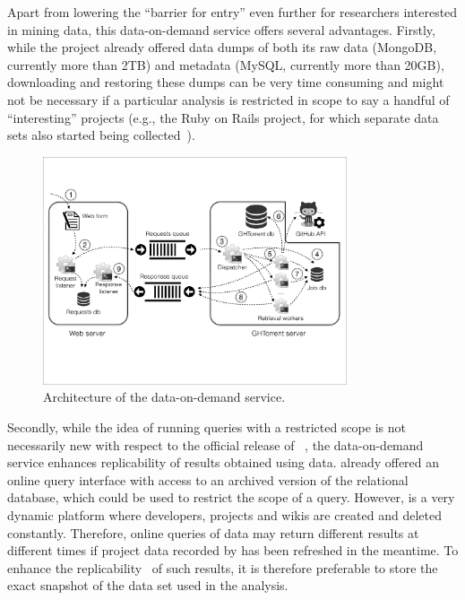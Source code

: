 Apart from lowering the ``barrier for entry'' even further for researchers interested in mining \gh data,
this data-on-demand service offers several advantages.
Firstly, while the \ght project already offered data dumps of both its raw data (MongoDB, currently more than 2TB)
and metadata (MySQL, currently more than 20GB), downloading and restoring these dumps can be
very time consuming and might not be necessary if a particular analysis is restricted in scope to say a handful
of ``interesting'' \gh projects (e.g., the Ruby on Rails project, for which separate data sets also started being
collected~\cite{wagstrom2013network}).

\begin{figure}[t]
\begin{center}
\includegraphics[width=0.8\textwidth, trim=5 160 5 105, clip=True]{figures/architecture.pdf}
\caption{Architecture of the \ght data-on-demand service.}
\label{fig:architecture}
\end{center}
\end{figure}

Secondly, while the idea of running queries with a restricted scope is not necessarily new with respect to
the official release of \linebreak \ght~\cite{gousios2012ghtorent}, the data-on-demand service enhances replicability
of results obtained using \ght data.
\ght already offered an online query interface with access to an archived version of the relational database,
which could be used to restrict the scope of a query.
However, \gh is a very dynamic platform where developers, projects and wikis are created and deleted constantly.
Therefore, online queries of \ght data may return different results at different times if project data recorded
by \ght has been refreshed in the meantime.
To enhance the replicability~\cite{gonzalez2012reproducibility} of such results, it is therefore preferable to
store the exact snapshot of the data set used in the analysis.

